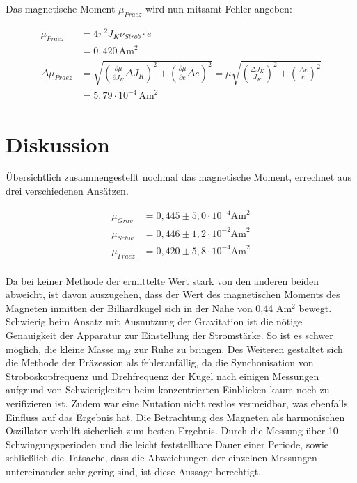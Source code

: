 Das magnetische Moment $\mu_{Praez}$ wird nun mitsamt Fehler angeben:

\begin{align}
 \nonumber
 \mu_{Praez} &= 4\pi^2 J_K \nu_{Strob} \cdot e \\
 &= 0,420\, \text{Am}^2\\
 \nonumber
 \Delta \mu_{Praez} &= \sqrt{\left(\frac{\partial \mu}{\partial J_{K}}\Delta J_{K} \right)^2 + \left(\frac{\partial \mu}{\partial e}\Delta e \right)^2} = \mu \sqrt{\left( \frac{\Delta J_{K}}{J_{K}}\right)^2 + \left( \frac{\Delta e}{e}\right)^2}\\
 &= 5,79 \cdot 10^{-4}\, \text{Am}^2
\end{align}

\section{Diskussion}
Übersichtlich zusammengestellt nochmal das magnetische Moment, errechnet aus drei verschiedenen Ansätzen.

\begin{align*}
 \mu_{Grav} &= 0,445 \pm 5,0 \cdot 10^{-4} \text{Am}^2\\
 \mu_{Schw} &= 0,446 \pm 1,2 \cdot 10^{-2} \text{Am}^2\\
 \mu_{Praez} &= 0,420 \pm 5,8 \cdot 10^{-4} \text{Am}^2\\
\end{align*}

Da bei keiner Methode der ermittelte Wert stark von den anderen beiden abweicht, ist davon auszugehen, dass der Wert des magnetischen 
Moments des Magneten inmitten der Billiardkugel sich in der Nähe von 0,44 Am$^2$ bewegt. Schwierig beim Ansatz mit Ausnutzung der
Gravitation ist die nötige Genauigkeit der Apparatur zur Einstellung der Stromstärke. So ist es schwer möglich, die kleine Masse m$_{kl}$
zur Ruhe zu bringen. Des Weiteren gestaltet sich die Methode der Präzession als fehleranfällig, da die Synchonisation von Stroboskopfrequenz
und Drehfrequenz der Kugel nach einigen Messungen aufgrund von Schwierigkeiten beim konzentrierten Einblicken kaum noch zu verifizieren 
ist. Zudem war eine Nutation nicht restlos vermeidbar, was ebenfalls Einfluss auf das Ergebnis hat. Die Betrachtung des Magneten als
harmonischen Oszillator verhilft sicherlich zum besten Ergebnis. Durch die Messung über 10 Schwingungsperioden und die leicht feststellbare Dauer
einer Periode, sowie schließlich die Tatsache, dass die Abweichungen der einzelnen Messungen untereinander sehr gering sind, ist diese Aussage
berechtigt.






